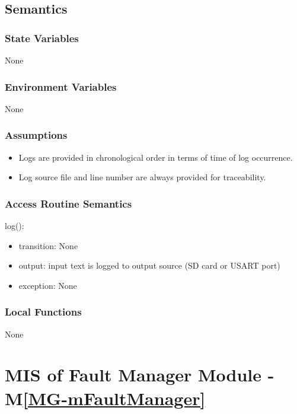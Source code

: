 \documentclass[12pt, titlepage]{article}
\newcommand{\mref}[1]{M\ref{#1}}
\begin{document}
\subsection{Semantics}

\subsubsection{State Variables}

None

\subsubsection{Environment Variables}

None

\subsubsection{Assumptions}

\begin{itemize}
  \item Logs are provided in chronological order in terms of time of log
    occurrence.
  \item Log source file and line number are always provided for traceability.
\end{itemize}

\subsubsection{Access Routine Semantics}

\noindent log():
\begin{itemize}
\item transition: None
\item output: input text is logged to output source (SD card or USART port)
\item exception: None
\end{itemize}

\subsubsection{Local Functions}

None

\newpage 


\section{MIS of Fault Manager Module - \mref{MG-mFaultManager}
  \label{mod:FaultManager}} 
\end{document}
